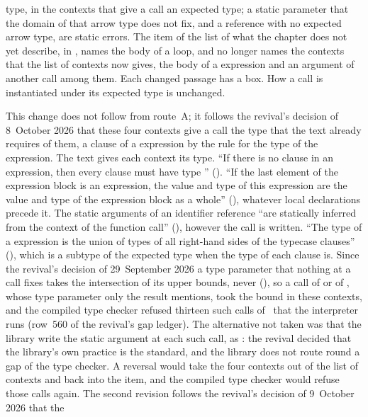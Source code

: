 \begin{description}
type, in the contexts that give a call an expected type; a static parameter
that the domain of that arrow type does not fix, and a reference with no
expected arrow type, are static errors.
The item of the list of what the chapter does not yet describe, in
, names the body of a  loop, and no longer
names the contexts that the list of contexts now gives, the body of a
 expression and an argument of another call among them.
Each changed passage has a box.
How a call is instantiated under its expected type is unchanged.
\item[Rationale] This change does not follow from route~A; it follows the
revival's decision of 8~October 2026 that these four contexts give a call the
type that the text already requires of them, a clause of a 
expression by the rule for the type of the  expression.
The text gives each context its type.
``If there is no  clause in an  expression, then every clause
must have type \EXP{()}'' ().
``If the last element of the expression block is an expression, the value and
type of this expression are the value and type of the expression block as a
whole'' (), whatever local declarations precede it.
The static arguments of an identifier reference ``are statically inferred from
the context of the function call'' (), however the call is
written.
``The type of a  expression is the union of types of all
right-hand sides of the typecase clauses'' (), which is a
subtype of the expected type when the type of each clause is.
Since the revival's decision of 29~September 2026 a type parameter that nothing
at a call fixes takes the intersection of its upper bounds, never
 (), so a call of  or
 of \library, whose type parameter only the result
mentions, took the bound  in these contexts, and the compiled type
checker refused thirteen such calls of \library\ that the interpreter runs
(row~560 of the revival's gap ledger).
The alternative not taken was that the library write the static argument at
each such call, as : the revival
decided that the library's own practice is the standard, and the library does
not route round a gap of the type checker.
A reversal would take the four contexts out of the list of contexts and back
into the item, and the compiled type checker would refuse those calls again.
The second revision follows the revival's decision of 9~October 2026 that the

\end{description}

